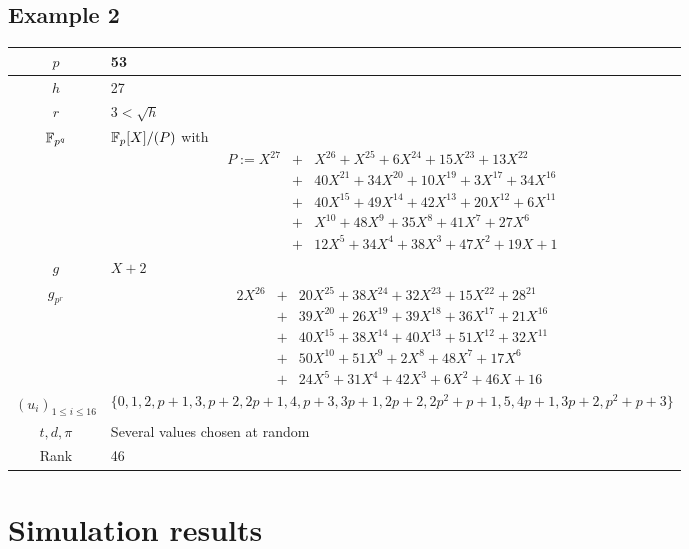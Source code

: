 \documentclass[a4paper]{article}
\newcommand{\GF}[1]{\F_{#1}}
\begin{document}
\newpage
\subsection{Example 2}
\label{Ex:2}



\begin{center}
\begin{tabularx}{\textwidth}{|c|X|} \hline
$p$ & 53  \\ \hline
$h$ & 27  \\ \hline
$r$ & $3 < \sqrt{h}$  \\ \hline
$\GF{p^q}$ & $\GF{p}[X] / (P)$ with
\begin{eqnarray*}
P := X^{27} &+& X^{26} + X^{25} + 6X^{24} + 15X^{23} + 13X^{22} \\
&+& 40X^{21} + 34X^{20} + 10X^{19} + 3X^{17} + 34X^{16}\\
&+& 40X^{15} + 49X^{14} + 42X^{13} + 20X^{12} + 6X^{11} \\
&+& X^{10} + 48X^9 + 35X^8 + 41X^7 + 27X^6 \\
&+& 12X^5 + 34X^4 + 38X^3 + 47X^2 + 19X + 1
\end{eqnarray*} \\ \hline
$g$ & $X+2$ \\ \hline
$g_{p^r}$ &  \begin{eqnarray*}
2X^{26} &+& 20X^{25} + 38X^{24} + 32X^{23} + 15X^{22} + 28^{21} \\
&+& 39X^{20} + 26X^{19} + 39X^{18} + 36X^{17} + 21X^{16}\\
&+& 40X^{15} + 38X^{14} + 40X^{13} + 51X^{12} + 32X^{11} \\
&+& 50X^{10} + 51X^9 + 2X^8 + 48X^7 + 17X^6 \\
&+& 24X^5 + 31X^4 + 42X^3 + 6X^2 + 46X + 16
\end{eqnarray*} \\ \hline
$(u_i)_{1 \leq i \leq 16}$ & $$\{ 0,1,2,p+1,3,p+2,2p+1,4,p+3,3p+1,2p+2,2p^2+p+1,5,4p+1,3p+2,p^2+p+3 \} $$ \\ \hline
$t, d, \pi$ & Several values chosen at random \\ \hline
Rank & 46 \\ \hline
\end{tabularx}
\end{center}




\newpage
\section{Simulation results}
\label{Sim:res}
\end{document}
